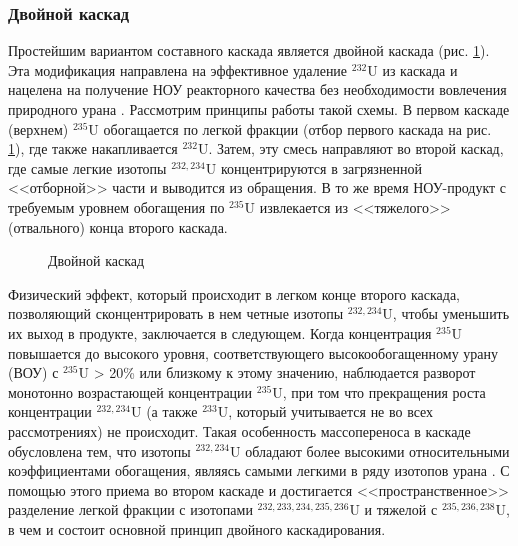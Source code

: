\subsubsection{Двойной каскад}

Простейшим вариантом составного каскада является двойной каскада (рис. \ref{fig:double_ru}).
Эта модификация направлена на эффективное удаление $^{232}$U из каскада и нацелена на получение НОУ реакторного качества без необходимости вовлечения природного урана \cite{SosninYuChelcov, TehnicheskieResheniyaPo}.
Рассмотрим принципы работы такой схемы.
В первом каскаде (верхнем) $^{235}$U обогащается по легкой фракции (отбор первого каскада на рис. \ref{fig:double_ru}), где также накапливается $^{232}$U.
Затем, эту смесь направляют во второй каскад, где самые легкие изотопы $^{232,234}$U концентрируются в загрязненной <<отборной>> части и выводится из обращения.
В то же время НОУ-продукт с требуемым уровнем обогащения по $^{235}$U извлекается из <<тяжелого>> (отвального) конца второго каскада.
\begin{figure}[ht]
  \caption{Двойной каскад}\label{fig:double_ru}
\end{figure}

Физический эффект, который происходит в легком конце второго каскада, позволяющий сконцентрировать в нем четные изотопы $^{232,234}$U, чтобы уменьшить их выход в продукте, заключается в следующем. Когда концентрация $^{235}$U повышается до высокого уровня, соответствующего высокообогащенному урану (ВОУ) с $^{235}$U > 20\% или близкому к этому значению, наблюдается разворот монотонно возрастающей концентрации $^{235}$U, при том что прекращения роста концентрации $^{232,234}$U (а также $^{233}$U, который учитывается не во всех рассмотрениях) не происходит. Такая особенность массопереноса в каскаде обусловлена тем, что изотопы $^{232,234}$U обладают более высокими относительными коэффициентами обогащения, являясь самыми легкими в ряду изотопов урана \cite{borodynyaIssledovanieProblemyVovlecheniya1989}.  С помощью этого приема во втором каскаде и достигается <<пространственное>> разделение легкой фракции с изотопами $^{232,233,234,235,236}$U и тяжелой с $^{235,236,238}$U, в чем и состоит основной принцип двойного каскадирования.

